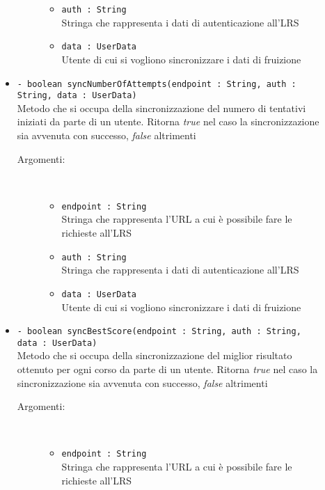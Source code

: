 \documentclass[../Tesi.tex]{subfiles}
\begin{document}
\begin{description}
\begin{itemize}
\begin{description}
\begin{itemize}
						\item \texttt{auth : String}\\
						Stringa che rappresenta i dati di autenticazione all'LRS

						\item \texttt{data : UserData}\\
						Utente di cui si vogliono sincronizzare i dati di fruizione
					\end{itemize}
				\end{description}

				\item \texttt{- boolean syncNumberOfAttempts(endpoint : String, auth : String, data : UserData)}\\
				Metodo che si occupa della sincronizzazione del numero di tentativi iniziati da parte di un utente. Ritorna \textit{true} nel caso la sincronizzazione sia avvenuta con successo, \textit{false} altrimenti
				\begin{description}
					\item[Argomenti:] \
					\begin{itemize}
						\item \texttt{endpoint : String}\\
						Stringa che rappresenta l'URL a cui è possibile fare le richieste all'LRS

						\item \texttt{auth : String}\\
						Stringa che rappresenta i dati di autenticazione all'LRS

						\item \texttt{data : UserData}\\
						Utente di cui si vogliono sincronizzare i dati di fruizione
					\end{itemize}
				\end{description}

				\item \texttt{- boolean syncBestScore(endpoint : String, auth : String, data : UserData)}\\
				Metodo che si occupa della sincronizzazione del miglior risultato ottenuto per ogni corso da parte di un utente. Ritorna \textit{true} nel caso la sincronizzazione sia avvenuta con successo, \textit{false} altrimenti
				\begin{description}
					\item[Argomenti:] \
					\begin{itemize}
						\item \texttt{endpoint : String}\\
						Stringa che rappresenta l'URL a cui è possibile fare le richieste all'LRS


\end{itemize}
\end{description}
\end{itemize}
\end{description}
\end{document}
